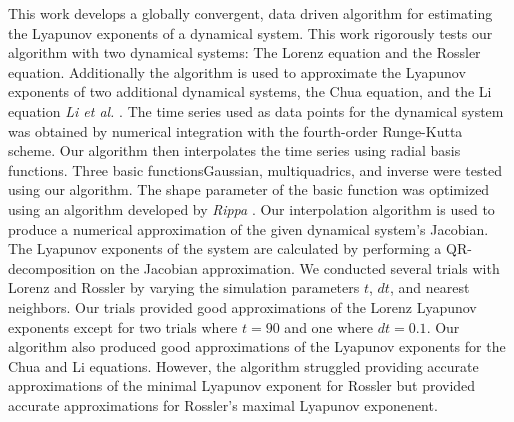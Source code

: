 

This work develops a globally convergent, data driven algorithm for estimating the Lyapunov exponents of a dynamical system.
This work rigorously tests our algorithm with two dynamical systems: The Lorenz equation and the Rossler equation. Additionally
the algorithm is used to approximate the Lyapunov exponents of two additional dynamical systems, the Chua equation, and
the Li equation \textit{Li et al.} \cite{item:6}.
The time series used as data points for the dynamical system was obtained
by numerical integration with the fourth-order Runge-Kutta scheme. Our algorithm then interpolates the time series
using radial basis functions. Three basic functions\texttwelveudash Gaussian, multiquadrics, and inverse\texttwelveudash
were tested using our algorithm. The shape parameter of the basic function was optimized using an algorithm
developed by \textit{Rippa} \cite{item:3}.
Our interpolation algorithm is used to produce a numerical approximation of the given dynamical system's Jacobian.
The Lyapunov exponents of the system are calculated by performing a QR-decomposition on the Jacobian approximation. We conducted
several trials with Lorenz and Rossler by varying the simulation parameters $t$, $dt$, and nearest neighbors.
Our trials provided good approximations of the Lorenz Lyapunov exponents except for two trials where $t=90$ and one where $dt=0.1$.
Our algorithm also produced good approximations of the Lyapunov exponents for the Chua and Li equations. However, the
algorithm struggled providing accurate approximations of the minimal Lyapunov exponent for Rossler but provided
accurate approximations for Rossler's maximal Lyapunov exponenent.


